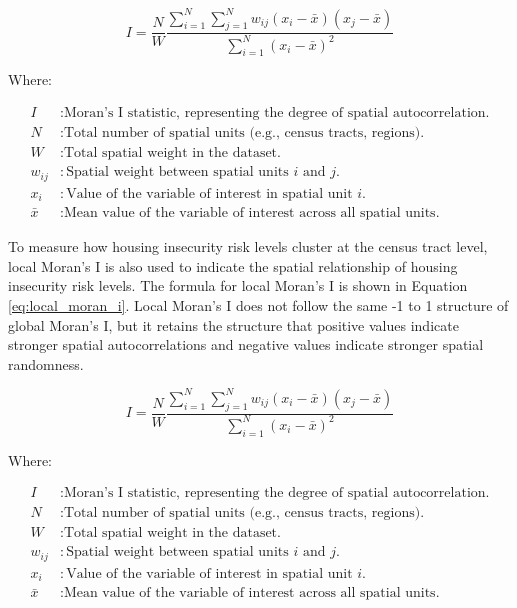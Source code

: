 \begin{equation}\label{eq:moran_i}
    I = \frac{N}{W} \frac{\sum_{i=1}^{N} \sum_{j=1}^{N} w_{ij} (x_i - \bar{x})(x_j - \bar{x})}{\sum_{i=1}^{N} (x_i - \bar{x})^2}
\end{equation}

Where:

\begin{align*}
I & : \text{Moran's I statistic, representing the degree of spatial autocorrelation.} \\
N & : \text{Total number of spatial units (e.g., census tracts, regions).} \\
W & : \text{Total spatial weight in the dataset.} \\
w_{ij} & : \text{Spatial weight between spatial units \(i\) and \(j\).} \\
x_i & : \text{Value of the variable of interest in spatial unit \(i\).} \\
\bar{x} & : \text{Mean value of the variable of interest across all spatial units.}
\end{align*}

To measure how housing insecurity risk levels cluster at the census tract level, local Moran's I is also used to indicate the spatial relationship of housing insecurity risk levels. The formula for local Moran's I is shown in Equation \ref{eq:local_moran_i}. Local Moran's I does not follow the same -1 to 1 structure of global Moran's I, but it retains the structure that positive values indicate stronger spatial autocorrelations and negative values indicate stronger spatial randomness. 

\begin{equation}\label{eq:local_moran_i}
    I = \frac{N}{W} \frac{\sum_{i=1}^{N} \sum_{j=1}^{N} w_{ij} (x_i - \bar{x})(x_j - \bar{x})}{\sum_{i=1}^{N} (x_i - \bar{x})^2}
\end{equation}

Where:

\begin{align*}
I & : \text{Moran's I statistic, representing the degree of spatial autocorrelation.} \\
N & : \text{Total number of spatial units (e.g., census tracts, regions).} \\
W & : \text{Total spatial weight in the dataset.} \\
w_{ij} & : \text{Spatial weight between spatial units \(i\) and \(j\).} \\
x_i & : \text{Value of the variable of interest in spatial unit \(i\).} \\
\bar{x} & : \text{Mean value of the variable of interest across all spatial units.}
\end{align*}


